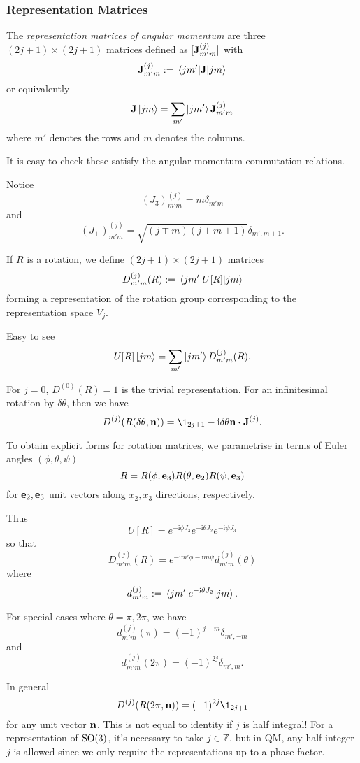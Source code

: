 \documentclass[a4paper,11pt]{article}
\begin{document}
	\subsubsection{Representation Matrices}
	\begin{defi}
		The \emph{representation matrices of angular momentum} are three $(2j+1)\times (2j+1)$ matrices defined as $[\vb J _{m'm}^{(j)}]$ with
		\[
			\vb J _{m'm}^{(j)} := \mel{jm'}{\vb J}{jm}
		\]
		or equivalently
		\[
			\vb J \ket{jm} = \sum _{m'} \ket{jm'}\vb J _{m'm}^{(j)}
		\]
		where $m'$ denotes the rows and $m$ denotes the columns.

	\end{defi}

	It is easy to check these satisfy the angular momentum commutation relations.

	Notice
	\[
		(J_3)_{m'm}^{(j)} = m \delta _{m'm}
	\]
	and
	\[
		(J_\pm)_{m'm}^{(j)} = \sqrt{(j \mp m)(j \pm m + 1)}\delta _{m',m\pm 1}.
	\]
	
	If $R$ is a rotation, we define $(2j+1)\times (2j+1)$ matrices
	\[
		D ^{(j)}_{m'm}(R):= \mel{jm'}{U[R]}{jm}
	\]
	forming a representation of the rotation group corresponding to the representation space $V_j$.

	Easy to see
	\[
		U[R]\ket{jm} = \sum _{m'}\ket{jm'}D _{m'm}^{(j)}(R).
	\]

	For $j=0$, $D ^{(0)}(R)=1$ is the trivial representation. For an infinitesimal rotation by $\delta \theta$, then we have
	\[
		D ^{(j)}(R(\delta \theta, \vb n)) = \1 _{2j+1} - \mathrm{i} \delta \theta \vb n \vdot \vb J ^{(j)}.
	\]
	
	To obtain explicit forms for rotation matrices, we parametrise in terms of Euler angles $(\phi,\theta,\psi)$ 
	\[
		R = R(\phi,\vb e_3)R(\theta,\vb e_2)R(\psi,\vb e_3)
	\]
	for $\vb e_2, \vb e_3$ unit vectors along $x_2,x_3$ directions, respectively.

	Thus
	\[
		U[R] = e ^{-\mathrm{i} \phi J_3} e ^{-\mathrm{i} \theta J_2} e ^{- \mathrm{i} \psi J_3}
	\]
	so that
	\[
		D _{m'm}^{(j)}(R) = e ^{-\mathrm{i} m' \phi - \mathrm{i} m \psi} d_{m'm}^{(j)}(\theta)
	\]
	where
	\[
		d _{m'm}^{(j)} := \mel{jm'}{e ^{-\mathrm{i}\theta J_2}}{jm}.
	\]
	
	For special cases where $\theta = \pi, 2 \pi$, we have
	\[
		d _{m'm}^{(j)}(\pi) = (-1)^{j-m} \delta _{m',-m}
	\]
	and
	\[
		d _{m'm}^{(j)}(2\pi) = (-1)^{2j} \delta _{m',m}.
	\]
	
	In general
	\[
		D ^{(j)} (R(2 \pi,\vb n)) = (-1)^{2j} \1 _{2j+1}
	\]
	for any unit vector $\vb n$. This is not equal to identity if $j$ is half integral! For a representation of $\operatorname{SO}(3)$, it's necessary to take $j \in \mathbb{Z}$, but in QM, any half-integer $j$ is allowed since we only require the representations up to a phase factor.
\end{document}
